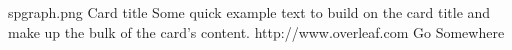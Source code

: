 \documentclass[12pt,a4paper]{article}
\begin{document}
\begin{card}
    {spgraph.png}
    {Card title}
    {Some quick example text to build on the card title and make up the bulk of the card's content.}
    {http://www.overleaf.com}
    {Go Somewhere}
\end{card}
\end{document}
